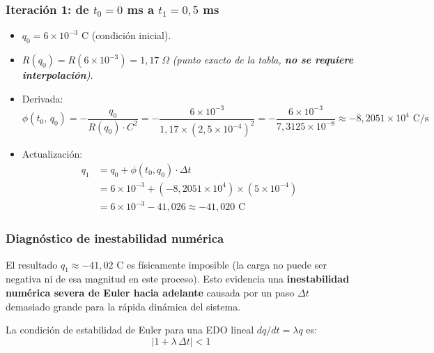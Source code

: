 \documentclass[12pt,a4paper]{article}
\begin{document}
\subsubsection*{Iteración 1: de $t_0 = 0$ ms a $t_1 = 0{,}5$ ms}

\begin{itemize}
    \item $q_0 = 6\times10^{-3}$ C (condición inicial).
    \item $R(q_0) = R(6\times10^{-3}) = 1{,}17\;\Omega$
          \quad \textit{(punto exacto de la tabla, \textbf{no se requiere interpolación})}.
    \item Derivada:
    \begin{equation}
        \phi(t_0,\,q_0) = -\frac{q_0}{R(q_0)\cdot C^2}
                        = -\frac{6\times10^{-3}}{1{,}17\times(2{,}5\times10^{-4})^2}
                        = -\frac{6\times10^{-3}}{7{,}3125\times10^{-8}}
                        \approx -8{,}2051\times10^{4} \text{ C/s}
    \end{equation}
    \item Actualización:
    \begin{equation}
        \begin{aligned}
        q_1 &= q_0 + \phi(t_0,q_0)\cdot\Delta t \\
            &= 6\times10^{-3} + (-8{,}2051\times10^{4})\times (5\times10^{-4}) \\
            &= 6\times10^{-3} - 41{,}026 \approx -41{,}020 \text{ C}
        \end{aligned}
    \end{equation}
\end{itemize}

\subsubsection*{Diagnóstico de inestabilidad numérica}

El resultado $q_1 \approx -41{,}02$ C es físicamente imposible (la carga no puede
ser negativa ni de esa magnitud en este proceso). Esto evidencia una \textbf{inestabilidad
numérica severa de Euler hacia adelante} causada por un paso $\Delta t$ demasiado
grande para la rápida dinámica del sistema.

La condición de estabilidad de Euler para una EDO lineal $dq/dt = \lambda q$
es:
\begin{equation}
    |1 + \lambda\,\Delta t| < 1
\end{equation}
\end{document}

